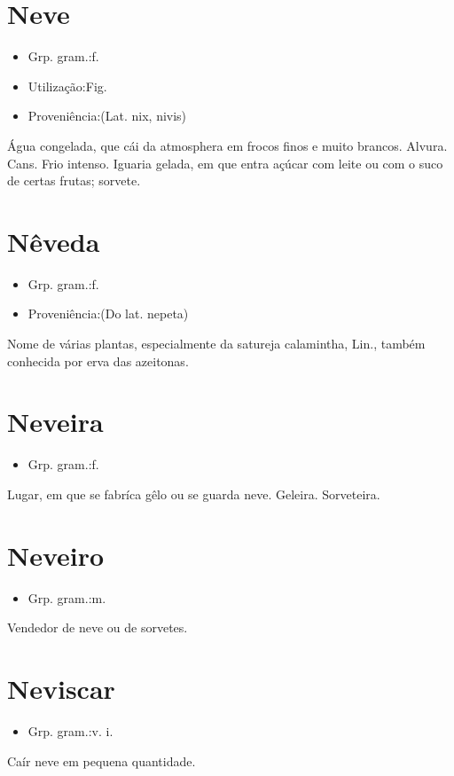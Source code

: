 \section{Neve}
\begin{itemize}
\item {Grp. gram.:f.}
\end{itemize}
\begin{itemize}
\item {Utilização:Fig.}
\end{itemize}
\begin{itemize}
\item {Proveniência:(Lat. \textunderscore nix\textunderscore , \textunderscore nivis\textunderscore )}
\end{itemize}
Água congelada, que cái da atmosphera em frocos finos e muito brancos.
Alvura.
Cans.
Frio intenso.
Iguaria gelada, em que entra açúcar com leite ou com o suco de certas frutas; sorvete.
\section{Nêveda}
\begin{itemize}
\item {Grp. gram.:f.}
\end{itemize}
\begin{itemize}
\item {Proveniência:(Do lat. \textunderscore nepeta\textunderscore )}
\end{itemize}
Nome de várias plantas, especialmente da \textunderscore satureja calamintha\textunderscore , Lin., também conhecida por \textunderscore erva das azeitonas\textunderscore .
\section{Neveira}
\begin{itemize}
\item {Grp. gram.:f.}
\end{itemize}
Lugar, em que se fabríca gêlo ou se guarda neve.
Geleira.
Sorveteira.
\section{Neveiro}
\begin{itemize}
\item {Grp. gram.:m.}
\end{itemize}
Vendedor de neve ou de sorvetes.
\section{Neviscar}
\begin{itemize}
\item {Grp. gram.:v. i.}
\end{itemize}
Caír neve em pequena quantidade.
